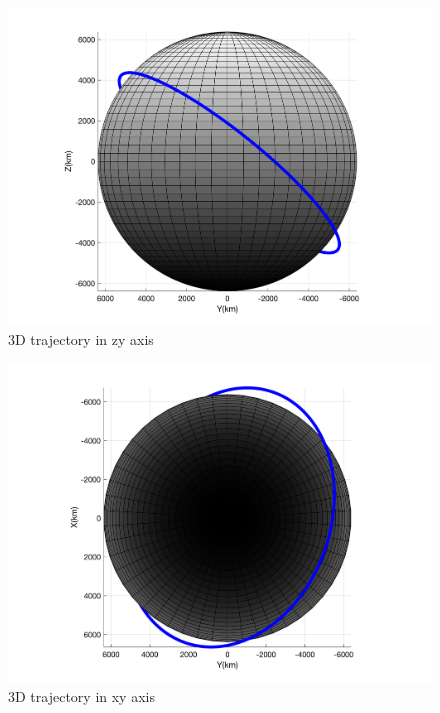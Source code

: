     \begin{figure}[H]
        \caption{3D trajectory in zy axis}
        \centering
        \includegraphics[width=16cm]{../Figure/Short_project/yz_view.png}
    \end{figure}

    \begin{figure}[H]
        \caption{3D trajectory in xy axis}
        \centering
        \includegraphics[width=16cm]{../Figure/Short_project/xy_view.png}
    \end{figure}